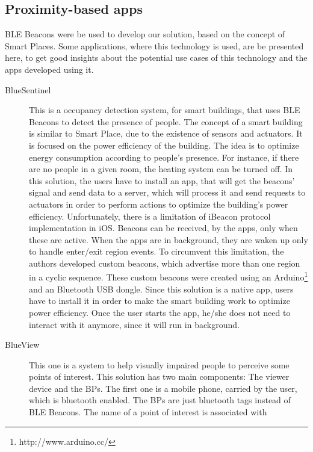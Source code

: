 \subsection{Proximity-based apps}
\label{sub:background_ble_beacons_applications}
\gls{BLE} Beacons were
be used to develop our solution, based on the concept of Smart Places.
Some
applications, where this technology is used,
are be presented here, to
get good insights about the potential use cases of this
technology and the apps developed using it.
\begin{description}
  \item[BlueSentinel\cite{Conte2014}]
  This is a
  occupancy detection system, for smart buildings,
  that uses \gls{BLE} Beacons to detect the presence of
  people. The concept of a smart building
  is similar to Smart Place,
  due to the existence of sensors and actuators.
  It is focused on the power efficiency of the
  building. The idea is to optimize energy
  consumption according to people's presence.
  For instance, if there are no people in a given room,
  the heating system can be turned off.
  In this solution, the users have to install
  an app, that will get the beacons' signal and
  send data to a server, which will process it
  and send requests to actuators in order to
  perform actions to optimize the
  building's power efficiency.
  Unfortunately, there is a limitation
  of iBeacon protocol implementation
  in iOS.
  Beacons can be received, by the apps,
  only when these are active. When the apps are in
  background, they are waken up only to handle
  enter/exit region events. To circumvent this
  limitation, the authors developed custom
  beacons, which advertise more than one region
  in a cyclic sequence. These custom beacons
  were created using an
  Arduino\footnote{http://www.arduino.cc/}
  and an Bluetooth \gls{USB} dongle.
  Since this solution is a native app,
  users have to install it in order
  to make the smart building work to
  optimize power efficiency.
  Once the user starts the app, he/she does not
  need to interact with it anymore, since it
  will run in background.
  \item[BlueView\cite{Chen2013}]
  This one is a system to help
  visually impaired people to perceive some points of interest.
  This solution has two main components: The viewer device
  and the \glspl{BP}. The first one is a mobile phone,
  carried by the user, which is bluetooth enabled.
  The \glspl{BP} are just bluetooth tags instead of
  \gls{BLE} Beacons. The name of a point of interest is associated with

\end{description}
